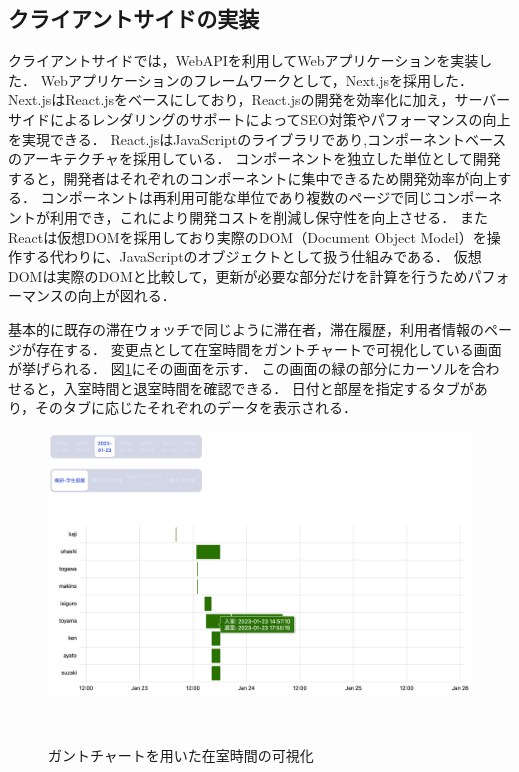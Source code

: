 

\subsection{クライアントサイドの実装}\label{4.1.2}
クライアントサイドでは，WebAPIを利用してWebアプリケーションを実装した．
Webアプリケーションのフレームワークとして，Next.jsを採用した．
Next.jsはReact.jsをベースにしており，React.jsの開発を効率化に加え，サーバーサイドによるレンダリングのサポートによってSEO対策やパフォーマンスの向上を実現できる．
React.jsはJavaScriptのライブラリであり,コンポーネントベースのアーキテクチャを採用している．
コンポーネントを独立した単位として開発すると，開発者はそれぞれのコンポーネントに集中できるため開発効率が向上する．
コンポーネントは再利用可能な単位であり複数のページで同じコンポーネントが利用でき，これにより開発コストを削減し保守性を向上させる．
またReactは仮想DOMを採用しており実際のDOM（Document Object Model）を操作する代わりに、JavaScriptのオブジェクトとして扱う仕組みである．
仮想DOMは実際のDOMと比較して，更新が必要な部分だけを計算を行うためパフォーマンスの向上が図れる．



基本的に既存の滞在ウォッチで同じように滞在者，滞在履歴，利用者情報のページが存在する．
変更点として在室時間をガントチャートで可視化している画面が挙げられる．
図\ref{fig:gantt}にその画面を示す．
この画面の緑の部分にカーソルを合わせると，入室時間と退室時間を確認できる．
日付と部屋を指定するタブがあり，そのタブに応じたそれぞれのデータを表示される．

\begin{figure}[tbh]
  \centering
  \includegraphics[width=15cm]{image/gantt.png}
  \caption{ガントチャートを用いた在室時間の可視化}　\label{fig:gantt}
\end{figure}



